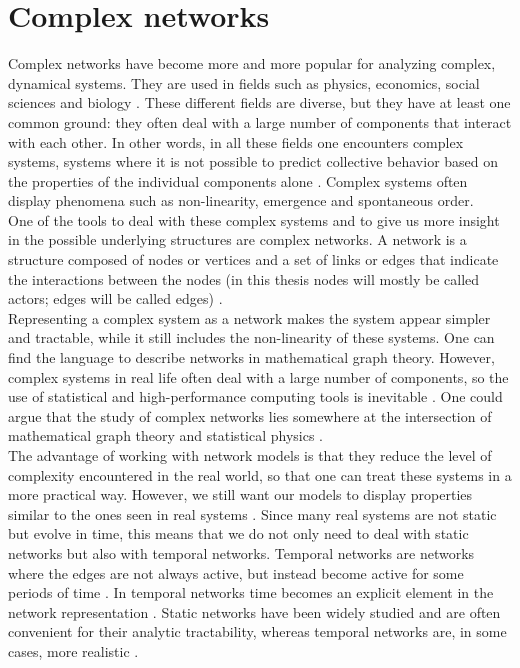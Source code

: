 \documentclass[11 pt , letterpaper , twoside , openright]{book}
\begin{document}
\section{Complex networks}\label{complNet}

Complex networks have become more and more popular for analyzing complex, dynamical systems. They are used in fields such as physics, economics, social sciences and biology \cite{Costa2008}. These different fields are diverse, but they have at least one common ground: they often deal with a large number of components that interact with each other. In other words, in all these fields one encounters complex systems, systems where it is not possible to predict collective behavior based on the properties of the individual components alone \cite{Mata2020}. Complex systems often display phenomena such as non-linearity, emergence and spontaneous order.
\\
\newline
One of the tools to deal with these complex systems and to give us more insight in the possible underlying structures are complex networks. A network is a structure composed of nodes or vertices and a set of links or edges that indicate the interactions between the nodes (in this thesis nodes will mostly be called actors; edges will be called edges) \cite{Mata2020}.\\
\newline
Representing a complex system as a network makes the system appear simpler and tractable, while it still includes the non-linearity of these systems. One can find the language to describe networks in mathematical graph theory. However, complex systems in real life often deal with a large number of components, so the use of statistical and high-performance computing tools is inevitable \cite{Mata2020}. One could argue that the study of complex networks lies somewhere at the intersection of mathematical graph theory and statistical physics \cite{F.Costa2007}.\\
\newline
The advantage of working with network models is that they reduce the level of complexity encountered in the real world, so that one can treat these systems in a more practical way. However, we still want our models to display properties similar to the ones seen in real systems \cite{Mata2020}. Since many real systems are not static but evolve in time, this means that we do not only need to deal with static networks but also with temporal networks. Temporal networks are networks where the edges are not always active, but instead become active for some periods of time \cite{Holme2012}. In temporal networks time becomes an explicit element in the network representation \cite{Holme2012}. Static networks have been widely studied and are often convenient for their analytic tractability, whereas temporal networks are, in some cases, more realistic \cite{Mata2020}.\\
\end{document}
